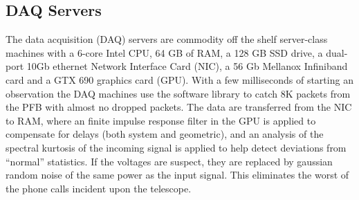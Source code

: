 \subsection {DAQ Servers}

The data acquisition (DAQ) servers are commodity off the shelf server-class machines with a 6-core Intel CPU, 64 GB of RAM, a 128 GB SSD drive, a dual-port 10Gb ethernet Network Interface Card (NIC), a 56 Gb Mellanox Infiniband card and a GTX 690 graphics card (GPU). With a few milliseconds of starting an observation the DAQ machines use the  software library to catch 8K packets from the PFB with almost no dropped packets. The data are transferred from the NIC to RAM, where an finite impulse response filter in the GPU is applied to compensate for delays (both system and geometric), and an analysis of the spectral kurtosis of the incoming signal is applied to help detect deviations from ``normal'' statistics. If the voltages are suspect, they are replaced by gaussian random noise of the same power as the input signal. This eliminates the worst of the phone calls incident upon the telescope. 